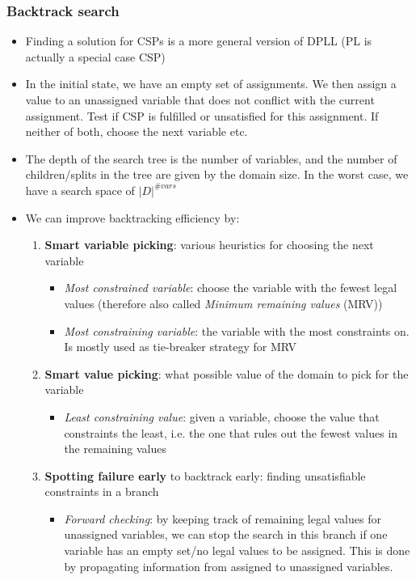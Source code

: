 \subsubsection{Backtrack search}
\begin{itemize}
	\item Finding a solution for CSPs is a more general version of DPLL (PL is actually a special case CSP)
	\item In the initial state, we have an empty set of assignments. We then assign a value to an unassigned variable that does not conflict with the current assignment. Test if CSP is fulfilled or unsatisfied for this assignment. If neither of both, choose the next variable etc.
	\item The depth of the search tree is the number of variables, and the number of children/splits in the tree are given by the domain size. In the worst case, we have a search space of $|D|^{\# vars}$
	\item We can improve backtracking efficiency by:
	\begin{enumerate}
		\item \textbf{Smart variable picking}: various heuristics for choosing the next variable
		\begin{itemize}
			\item \textit{Most constrained variable}: choose the variable with the fewest legal values (therefore also called \textit{Minimum remaining values} (MRV))
			\item \textit{Most constraining variable}: the variable with the most constraints on. Is mostly used as tie-breaker strategy for MRV
		\end{itemize}
		\item \textbf{Smart value picking}: what possible value of the domain to pick for the variable
		\begin{itemize}
			\item \textit{Least constraining value}: given a variable, choose the value that constraints the least, i.e. the one that rules out the fewest values in the remaining values  
		\end{itemize}
		\item \textbf{Spotting failure early} to backtrack early: finding unsatisfiable constraints in a branch
		\begin{itemize}
			\item \textit{Forward checking}: by keeping track of remaining legal values for unassigned variables, we can stop the search in this branch if one variable has an empty set/no legal values to be assigned. This is done by propagating information from assigned to unassigned variables.

\end{itemize}
\end{enumerate}
\end{itemize}
